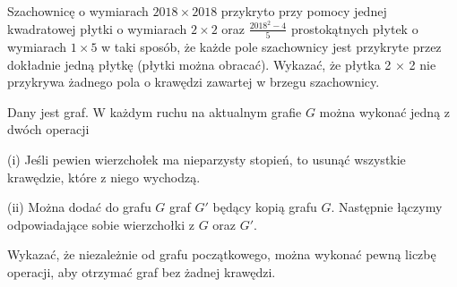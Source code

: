 



\noindent
Szachownicę o wymiarach $2018\times 2018$ przykryto przy pomocy jednej kwadratowej płytki o wymiarach $2 \times 2$ oraz $\frac{2018^2 − 4}{5}$ prostokątnych płytek o wymiarach $1 \times 5$ w taki sposób, że każde pole szachownicy jest przykryte przez dokładnie jedną płytkę (płytki można obracać). Wykazać, że płytka 2 × 2 nie przykrywa żadnego pola o krawędzi zawartej w brzegu szachownicy.



\noindent
Dany jest graf. W każdym ruchu na aktualnym grafie $G$ można wykonać jedną z dwóch operacji

(i) Jeśli pewien wierzchołek ma nieparzysty stopień, to usunąć wszystkie krawędzie, które z niego wychodzą.

(ii) Można dodać do grafu $G$ graf $G'$ będący kopią grafu $G$. Następnie łączymy odpowiadające sobie wierzchołki z $G$ oraz $G'$. 

\noindent
Wykazać, że niezależnie od grafu początkowego, można wykonać pewną liczbę operacji, aby otrzymać graf bez żadnej krawędzi.




